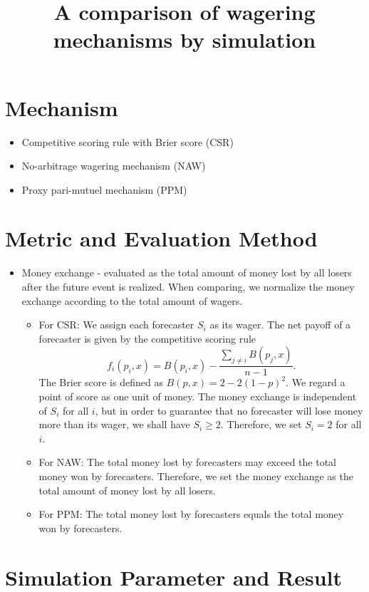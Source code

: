\documentclass[english,10pt]{article}
\begin{document}
\title{A comparison of wagering mechanisms by simulation}
\maketitle

\section{Mechanism}
	\begin{itemize}
	\item Competitive scoring rule with Brier score (CSR)
	\item No-arbitrage wagering mechanism (NAW)
	\item Proxy pari-mutuel mechanism (PPM)
	\end{itemize}
\section{Metric and Evaluation Method}
	\begin{itemize}
	\item Money exchange - evaluated as the total amount of money lost by all losers after the future event is realized. When comparing, we normalize the money exchange according to the total amount of wagers.
		\begin{itemize}
		\item For CSR: 
			We assign each forecaster $S_i$ as its wager. The net payoff of a forecaster is given by 
			the competitive scoring rule
			$$f_i(p_i,x) = B(p_i,x) - \frac{\sum_{j\ne i}B(p_j,x)}{n-1}.$$
			The Brier score is defined as $B(p, x) = 2-2(1-p)^2$.
			We regard a point of score as one unit of money. The money exchange is independent of $S_i$ for all $i$, but in order to guarantee that no forecaster will lose money more than its wager, we shall have $S_i \ge 2$. Therefore, we set $S_i=2$ for all $i$.
		\item For NAW:  
			The total money lost by forecasters may exceed the total money won by forecasters. 
			Therefore, we set the money exchange as the total amount of money lost by all losers.
		\item For PPM:
		  	The total money lost by forecasters equals the total money won by forecasters. 
		\end{itemize}
	\end{itemize}
\section{Simulation Parameter and Result}
\end{document}
